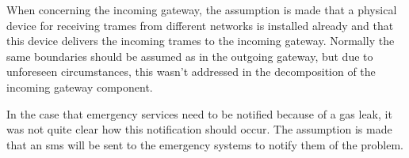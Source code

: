When concerning the incoming gateway, the assumption is made that a physical device for receiving trames 
from different networks is installed already and that this device delivers the incoming trames to the incoming gateway. 
Normally the same boundaries should be assumed as in the outgoing gateway, but due to unforeseen circumstances, this wasn't addressed in the decomposition of the incoming gateway component.

In the case that emergency services need to be notified because of a gas leak, it was not quite clear how this notification should occur. The assumption is made that an sms will be sent to the emergency systems to notify them of the problem.
